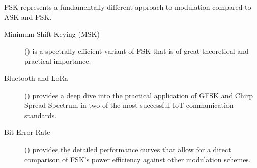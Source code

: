 \begin{importantbox}[title={Further Reading}]
    FSK represents a fundamentally different approach to modulation compared to ASK and PSK.
    \begin{description}
        \item[Minimum Shift Keying (MSK)] () is a spectrally efficient variant of FSK that is of great theoretical and practical importance.
        \item[Bluetooth and LoRa] () provides a deep dive into the practical application of GFSK and Chirp Spread Spectrum in two of the most successful IoT communication standards.
        \item[Bit Error Rate] () provides the detailed performance curves that allow for a direct comparison of FSK's power efficiency against other modulation schemes.
    \end{description}
\end{importantbox}